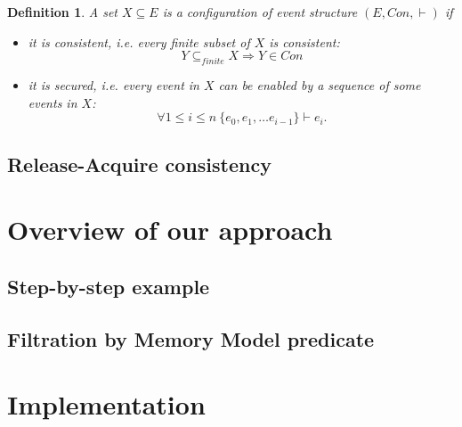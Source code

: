 \documentclass[conference]{IEEEtran}
\newtheorem{definition}{Definition}
\begin{document}
\begin{definition}
A set $X \subseteq E$ is a configuration of event structure $(E, Con, \vdash)$ if
\begin{itemize}
    \item it is consistent, i.e. every finite subset of $X$ is consistent:
    $$Y \subseteq_{finite} X \Longrightarrow Y \in Con$$
    \item it is secured, i.e. every event in $X$ can be enabled by a sequence of some events in $X$:
    $$\forall 1 \leq i \leq n \ \{ e_0, e_1, \ldots e_{i - 1} \} \vdash e_i.$$
\end{itemize}
\end{definition}

\subsection{Release-Acquire consistency}


\section{Overview of our approach}

\subsection{Step-by-step example}

\subsection{Filtration by Memory Model predicate}


\section{Implementation}
\end{document}

